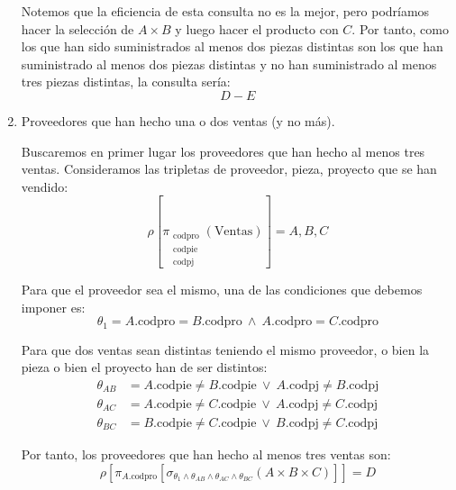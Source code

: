 \begin{ejercicio}
\begin{enumerate}
        Notemos que la eficiencia de esta consulta no es la mejor, pero podríamos hacer la selección de $A\times B$ y luego hacer el producto con $C$.
        Por tanto, como los que han sido suministrados al menos dos piezas distintas son los que han suministrado al menos dos piezas distintas y no han suministrado al menos tres piezas distintas, la consulta sería:
        \begin{equation*}
            D-E
        \end{equation*}

        \item Proveedores que han hecho una o dos ventas (y no más).
        
        Buscaremos en primer lugar los proveedores que han hecho al menos tres ventas.
        Consideramos las tripletas de proveedor, pieza, proyecto que se han vendido:
        \begin{equation*}
            \rho\left[\pi_{\substack{\text{codpro}\\\text{codpie}\\\text{codpj}}}\left(\text{Ventas}\right)\right]=A,B,C
        \end{equation*}

        Para que el proveedor sea el mismo, una de las condiciones que debemos imponer es:
        \begin{equation*}
            \theta_1 = A.\text{codpro} = B.\text{codpro} ~\land ~A.\text{codpro} = C.\text{codpro}
        \end{equation*}

        Para que dos ventas sean distintas teniendo el mismo proveedor, o bien la pieza o bien el proyecto han de ser distintos:
        \begin{align*}
            \theta_{AB} &= A.\text{codpie} \neq B.\text{codpie} ~\lor ~A.\text{codpj} \neq B.\text{codpj}\\
            \theta_{AC} &= A.\text{codpie} \neq C.\text{codpie} ~\lor ~A.\text{codpj} \neq C.\text{codpj}\\
            \theta_{BC} &= B.\text{codpie} \neq C.\text{codpie} ~\lor ~B.\text{codpj} \neq C.\text{codpj}
        \end{align*}

        Por tanto, los proveedores que han hecho al menos tres ventas son:
        \begin{equation*}
            \rho\left[\pi_{A.\text{codpro}}\left[\sigma_{\theta_1 \land \theta_{AB} \land \theta_{AC} \land \theta_{BC}}(A\times B\times C)\right]\right]=D
        \end{equation*}


\end{enumerate}
\end{ejercicio}
